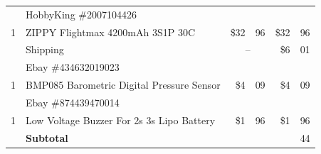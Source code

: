 \documentclass[11pt, a4paper, onecolumn, oneside, parskip=half]{scrartcl}
\begin{document}
\begin{tabular}{llr@{.}lr@{.}l}
  & \multicolumn{3}{l}{HobbyKing \#2007104426} \\ %
1 & ZIPPY Flightmax 4200mAh 3S1P 30C & \$32&96 & \$32&96 \\
  & Shipping & \multicolumn{2}{c}{--} & \$6&01 \\
\hline %

  & \multicolumn{3}{l}{Ebay \#434632019023} \\ %
1 & BMP085 Barometric Digital Pressure Sensor & \$4&09 & \$4&09 \\
\hline %

  & \multicolumn{3}{l}{Ebay \#874439470014} \\ %
1 & Low Voltage Buzzer For 2s 3s Lipo Battery & \$1&96 & \$1&96 \\
\hline %

\hline
  & \textbf{Subtotal} & \multicolumn{2}{c}{} & \texteuro 299&44 \\
\end{tabular}
\end{document}
